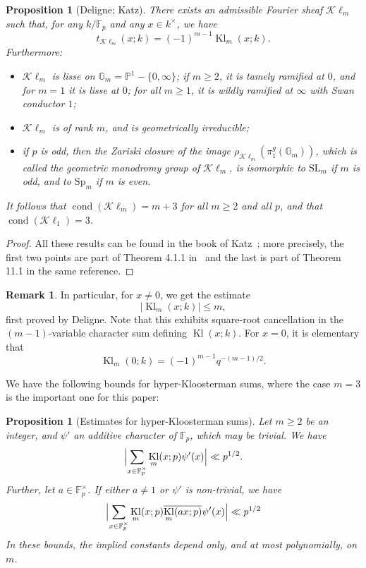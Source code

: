 \documentclass[12pt,a4paper,reqno]{amsart}
\numberwithin{equation}{section}
\DeclareMathOperator*\cond{cond}
\DeclareMathOperator{\hypk}{Kl}
\newcommand{\Kl}{\mathcal{K}\ell}
\theoremstyle{plain}
\newtheorem{proposition}[theorem]{Proposition}
\theoremstyle{definition}
\newtheorem{remark}[theorem]{Remark}
\newcommand\F{\mathbb{F}}
\newcommand\ov{\overline}
\newcommand\Gm{\mathbb{G}_m}
\newcommand\Pl{\mathbb{P}^1}
\newcommand\Fp{\F_{p}}
\newcommand\Fpt{\F_{p}^{\times}}
\begin{document}
\begin{proposition}[Deligne; Katz]\label{kl-sheaf} There exists an
  admissible Fourier sheaf $\Kl_m$ such that, for any $k/\Fp$ and any
  $x\in k^\times$, we have
$$
t_{\Kl_m}(x;k)=(-1)^{m-1}\hypk_m(x;k).
$$
Furthermore:
\begin{itemize}
\item $\Kl_m$ is lisse on $\Gm=\Pl-\{0,\infty\}$; if $m\geq 2$, it is
  tamely ramified at $0$, and for $m=1$ it is lisse at $0$; for all
  $m\geq 1$, it is wildly ramified at $\infty$ with Swan conductor
  $1$; 
\item $\Kl_m$ is of rank $m$, and is geometrically irreducible;
\item if $p$ is odd, then the Zariski closure of the image
  $\rho_{\Kl_m}(\pi^g_1(\Gm))$, which is called the \emph{geometric
    monodromy group} of $\Kl_m$, is isomorphic to $\mathrm{SL}_m$ if
  $m$ is odd, and to $\mathrm{Sp}_m$ if $m$ is even.
\end{itemize}
It follows that $\cond(\Kl_m)=m+3$ for all $m\geq 2$ and all $p$, and
that $\cond(\Kl_1)=3$.
\end{proposition}

\begin{proof}
  All these results can be found in the book of Katz~\cite{GKM}; more
  precisely, the first two points are part of Theorem 4.1.1
  in~\cite{GKM} and the last is part of Theorem 11.1 in the same
  reference. 
\end{proof}

\begin{remark}\label{romeo} In particular, for $x\neq 0$, we get the
  estimate
$$
|\hypk_m(x;k)|\leq m,
$$
first proved by Deligne. Note that this exhibits square-root
cancellation in the $(m-1)$-variable character sum defining
$\hypk(x;k)$. For $x=0$, it is elementary that
$$
\hypk_m(0;k)=(-1)^{m-1}q^{-(m-1)/2}.
$$
\end{remark}

We have the following bounds for hyper-Kloosterman sums, where the
case $m=3$ is the important one for this paper:

\begin{proposition}[Estimates for hyper-Kloosterman sums]\label{kls}
  Let $m\geq 2$ be an integer, and $\psi'$ an additive character of
  $\Fp$, which may be trivial. We have
\begin{equation}\label{klsumsfirstmoment}
\Bigl|\sum_{x\in\Fpt}\hypk_m(x;p)\psi'(x)\Bigr| \ll p^{1/2}.
\end{equation}
Further, let $a\in\Fpt$. If either $a\neq 1$ or $\psi'$ is
non-trivial, we have
\begin{equation}\label{klsumscorrelation}
  \Bigl|\sum_{x\in\Fpt}\hypk_m(x;p)\ov{\hypk_m(ax;p)}\psi'(x)\Bigr| \ll p^{1/2}
\end{equation}
In these bounds, the implied constants depend only, and at most
polynomially, on $m$.
\end{proposition}
\end{document}
